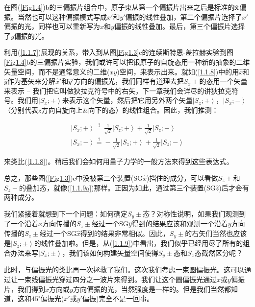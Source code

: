 \documentclass[UTF8,twoside]{ctexart}
\begin{document}
在图(\ref{Fig1.4})b的三偏振片组合中，原子束从第一个偏振片出来之后是标准的$\hat{\bf x}$偏振。当然也可以这种偏振模式写成$x'$和$y'$偏振的线性叠加，第二个偏振片选择了$x'$偏振的光，同样也可以重新写为$x$和$y$偏振的线性叠加。最后，第三个偏振片选择了$y$偏振的光。

利用(\ref{1.1.7})展现的关系，带入到从图{\ref{Fig1.3}}c的连续斯特恩-盖拉赫实验到图{\ref{Fig1.4}}b的三偏振片实验，我们或许可以把银原子的自旋态用一种新的抽象的二维矢量空间，而不是通常意义的二维($xy$)空间，来表示出来。就如(\ref{1.1.8})中的用$\hat{x}$和$\hat{y}$作为基矢来分解$\hat{x}'$和$\hat{y}'$方向的偏振光，我们同样有道理去把$S_x +$的态用一个矢量来表示 -- 我们把它叫做狄拉克符号中的右矢，下一章我们会详尽的讲狄拉克符号。我们用$\left|S_x ;+\right\rangle$来表示这个矢量，然后把它用另外两个矢量$\left|S_z ;+\right\rangle$，$\left|S_x ;-\right\rangle$（分别代表$z$方向自旋向上\&向下的态）的线性组合。因此，我们推测：

\begin{subequations} \label{1.1.9}
\begin{align}
\left|S_x ;+\right\rangle \overset{?}= \frac{1}{\sqrt{2}} \left|S_z ;+\right\rangle + \frac{1}{\sqrt{2}}\left|S_z ;-\right\rangle \label{1.1.9a}\\
\left|S_x ;-\right\rangle \overset{?}= -\frac{1}{\sqrt{2}}\left|S_z ;+\right\rangle + \frac{1}{\sqrt{2}}\left|S_z ;-\right\rangle
\end{align}
\end{subequations}

\noindent 来类比(\ref{1.1.8})。稍后我们会如何用量子力学的一般方法来得到这些表达式。

总之，那些图(\ref{Fig1.3})c中没被第二个装置(SG$\hat{x}$)挡住的成分，可以看做$S_z +$和$S_z -$的叠加态，就像(\ref{1.1.9a})那样。正因为如此，通过第三个装置(SG$\hat{z}$)后才会有两种成分。

我们紧接着就想到下一个问题：如何确定$S_y \pm$态？对称性说明，如果我们观测到了一个沿着$x$方向传播的$S_z \pm$经过一个SG$\hat{y}$得到的结果应该和观测一个沿着$y$方向传播的$S_z \pm$经过一个SG$\hat{x}$得到的结果非常相似。因此，$S_y \pm$的右矢们当然也应该是$\left|S_z; \pm\right\rangle$的线性叠加啦。但是，从(\ref{1.1.9})中看出，我们似乎已经用尽了所有的组合办法来写$\left|S_x ;\pm\right\rangle$，我们该如何构建矢量空间使得$S_y \pm$态和$S_x$态截然区分呢？

此时，与偏振光的类比再一次拯救了我们。这次我们考虑一束圆偏振光。这可以通过让一束线偏振光穿过四分之一波片来得到。我们让这个圆偏振光通过$x$或$y$偏振片，我们得到$x$方向或$y$方向偏振的光，当然强度是一样的。但是我们当然都知道，这和$45^{\circ}$偏振光($x'$或$y'$偏振)完全不是一回事。
\end{document}
